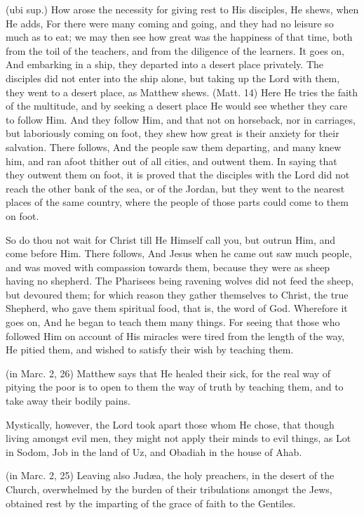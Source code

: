  (ubi sup.) How arose the necessity for giving rest to His disciples, He shews, when He adds, For there were many coming and going, and they had no leisure so much as to eat; we may then see how great was the happiness of that time, both from the toil of the teachers, and from the diligence of the learners. It goes on, And embarking in a ship, they departed into a desert place privately. The disciples did not enter into the ship alone, but taking up the Lord with them, they went to a desert place, as Matthew shews. (Matt. 14) Here He tries the faith of the multitude, and by seeking a desert place He would see whether they care to follow Him. And they follow Him, and that not on horseback, nor in carriages, but laboriously coming on foot, they shew how great is their anxiety for their salvation. There follows, And the people saw them departing, and many knew him, and ran afoot thither out of all cities, and outwent them. In saying that they outwent them on foot, it is proved that the disciples with the Lord did not reach the other bank of the sea, or of the Jordan, but they went to the nearest places of the same country, where the people of those parts could come to them on foot.

 So do thou not wait for Christ till He Himself call you, but outrun Him, and come before Him. There follows, And Jesus when he came out saw much people, and was moved with compassion towards them, because they were as sheep having no shepherd. The Pharisees being ravening wolves did not feed the sheep, but devoured them; for which reason they gather themselves to Christ, the true Shepherd, who gave them spiritual food, that is, the word of God. Wherefore it goes on, And he began to teach them many things. For seeing that those who followed Him on account of His miracles were tired from the length of the way, He pitied them, and wished to satisfy their wish by teaching them.

 (in Marc. 2, 26) Matthew says that He healed their sick, for the real way of pitying the poor is to open to them the way of truth by teaching them, and to take away their bodily pains.

 Mystically, however, the Lord took apart those whom He chose, that though living amongst evil men, they might not apply their minds to evil things, as Lot in Sodom, Job in the land of Uz, and Obadiah in the house of Ahab.

 (in Marc. 2, 25) Leaving also Judæa, the holy preachers, in the desert of the Church, overwhelmed by the burden of their tribulations amongst the Jews, obtained rest by the imparting of the grace of faith to the Gentiles.

